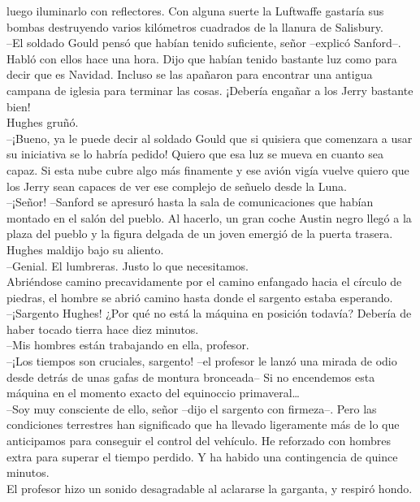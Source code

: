 luego iluminarlo con reflectores. Con alguna suerte la Luftwaffe
gastaría sus bombas destruyendo varios kilómetros cuadrados de la
llanura de Salisbury.\\
--El soldado Gould pensó que habían tenido suficiente, señor --explicó
Sanford--. Habló con ellos hace una hora. Dijo que habían tenido
bastante luz como para decir que es Navidad. Incluso se las apañaron
para encontrar una antigua campana de iglesia para terminar las cosas.
¡Debería engañar a los Jerry bastante bien!\\
Hughes gruñó.\\
--¡Bueno, ya le puede decir al soldado Gould que si quisiera que
comenzara a usar su iniciativa se lo habría pedido! Quiero que esa luz
se mueva en cuanto sea capaz. Si esta nube cubre algo más finamente y
ese avión vigía vuelve quiero que los Jerry sean capaces de ver ese
complejo de señuelo desde la Luna.\\
--¡Señor! --Sanford se apresuró hasta la sala de comunicaciones que
habían montado en el salón del pueblo. Al hacerlo, un gran coche Austin
negro llegó a la plaza del pueblo y la figura delgada de un joven
emergió de la puerta trasera.\\
Hughes maldijo bajo su aliento.\\
--Genial. El lumbreras. Justo lo que necesitamos.\\
Abriéndose camino precavidamente por el camino enfangado hacia el
círculo de piedras, el hombre se abrió camino hasta donde el sargento
estaba esperando.\\
--¡Sargento Hughes! ¿Por qué no está la máquina en posición todavía?
Debería de haber tocado tierra hace diez minutos.\\
--Mis hombres están trabajando en ella, profesor.\\
--¡Los tiempos son cruciales, sargento! --el profesor le lanzó una
mirada de odio desde detrás de unas gafas de montura bronceada-- Si no
encendemos esta máquina en el momento exacto del equinoccio
primaveral\ldots{}\\
--Soy muy consciente de ello, señor --dijo el sargento con firmeza--.
Pero las condiciones terrestres han significado que ha llevado
ligeramente más de lo que anticipamos para conseguir el control del
vehículo. He reforzado con hombres extra para superar el tiempo perdido.
Y ha habido una contingencia de quince minutos.\\
El profesor hizo un sonido desagradable al aclararse la garganta, y
respiró hondo.\\
